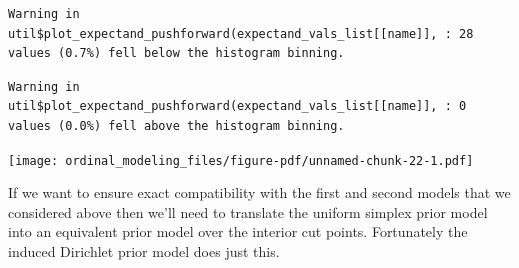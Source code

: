 \documentclass[
  letterpaper,
  DIV=11,
  numbers=noendperiod]{scrartcl}
\begin{document}
\begin{verbatim}
Warning in util$plot_expectand_pushforward(expectand_vals_list[[name]], : 28
values (0.7%) fell below the histogram binning.
\end{verbatim}

\begin{verbatim}
Warning in util$plot_expectand_pushforward(expectand_vals_list[[name]], : 0
values (0.0%) fell above the histogram binning.
\end{verbatim}

\texttt{[image: ordinal\_modeling\_files/figure-pdf/unnamed-chunk-22-1.pdf]}

If we want to ensure exact compatibility with the first and second
models that we considered above then we'll need to translate the uniform
simplex prior model into an equivalent prior model over the interior cut
points. Fortunately the induced Dirichlet prior model does just this.
\end{document}
